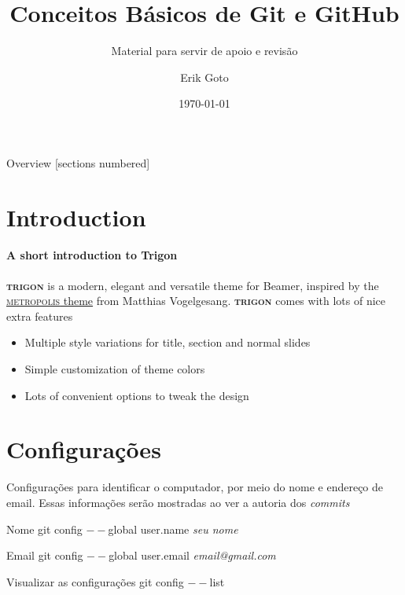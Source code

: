 \documentclass[aspectratio=169]{beamer}
\title{Conceitos Básicos de Git e GitHub}
\subtitle{Material para servir de apoio e revisão}
\author[E. Goto]{Erik Goto}
\institute{UNICAMP}
\date{\today}
\newcommand{\themename}{\textbf{\textsc{trigon}}\xspace}
\begin{document}
\titleframe

\begin{frame}{Overview}
[sections numbered]
	\begin{multicols}{3}
  \tableofcontents[hideallsubsections]
	\end{multicols}
  

\end{frame}
\section{Introduction}
\begin{frame}{\insertsectionhead}
  \framesubtitle{A short introduction to Trigon}
  \themename is a modern, elegant and versatile theme for Beamer, inspired by
  the
  \href{https://github.com/matze/mtheme}{\textsc{metropolis} theme} from Matthias
  Vogelgesang.
  \vfill
  \themename comes with lots of nice extra features
  \begin{itemize}
    \item Multiple style variations for title, section and normal slides
    \item Simple customization of theme colors
    \item Lots of convenient options to tweak the design
  \end{itemize}
\end{frame}


\section{Configurações}
\begin{frame}{\insertsectionhead}
	Configurações para identificar o computador, por meio do nome e endereço de email. Essas informações serão mostradas ao ver a autoria dos \textit{commits}
	\begin{block}{Nome}
		git config $--$global user.name \textit{seu nome}
	\end{block}
	\begin{block}{Email}
		git config $--$global user.email \textit{email@gmail.com}
	\end{block}
	\begin{block}{Visualizar as configurações}
		git config $--$list
	\end{block}
\end{frame}
\end{document}
